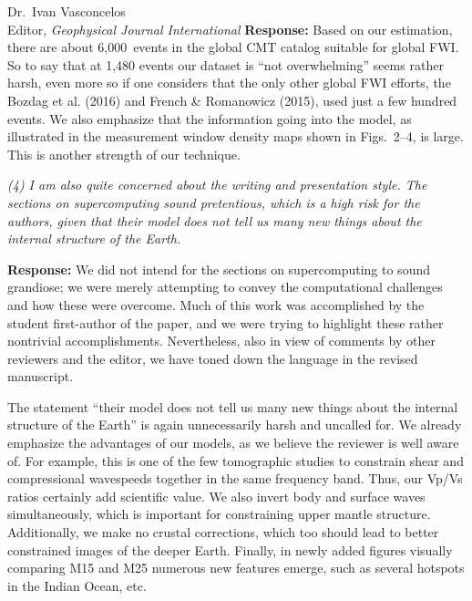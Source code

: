\documentclass[11pt,a4paper]{letter}
\newcommand{\response}[1]{\textbf{Response:} #1}
\newcommand{\rev}[1]{{\it{#1}}}
\begin{document}
\begin{letter}{Dr.~Ivan Vasconcelos\\
Editor, \textit{Geophysical Journal International}}
\response{
Based on our estimation, there are about 6,000~events in the global CMT catalog suitable for global FWI.
So to say that at 1,480 events our dataset is ``not overwhelming'' seems rather harsh,
even more so if one considers that the only other global FWI efforts,
the Bozdag et al. (2016) and French \& Romanowicz (2015),
used just a few hundred events.
We also emphasize that the information going into the model,
as illustrated in the measurement window density maps shown in Figs.~2--4, is large.
This is another strength of our technique.
}


\rev{(4) I am also quite concerned about the writing and presentation style. The sections on supercomputing sound pretentious, which is a high risk for the authors, given that their model does not tell us many new things about the internal structure of the Earth. 
}

\response{
We did not intend for the sections on supercomputing to sound grandiose; we were merely attempting to convey the computational challenges and how these were overcome.
Much of this work was accomplished by the student first-author of the paper, and we were trying to highlight these rather nontrivial accomplishments.
Nevertheless, also in view of comments by other reviewers and the editor, we have toned down the language in the revised manuscript.

The statement ``their model does not tell us many new things about the internal structure of the Earth'' is again unnecessarily harsh and uncalled for. We already emphasize the advantages of our models, as we believe the reviewer is well aware of. 
For example,
this is one of the few tomographic studies to constrain shear and compressional wavespeeds together in the same frequency band.
Thus, our Vp/Vs ratios certainly add scientific value.
We also invert body and surface waves simultaneously, which is important for constraining upper mantle structure.
Additionally, we make no crustal corrections, 
which too should lead to better constrained images of the deeper Earth.
Finally, in newly added figures visually comparing M15 and M25 numerous new features emerge,
such as several hotspots in the Indian Ocean, etc. 
}


\end{letter}
\end{document}
